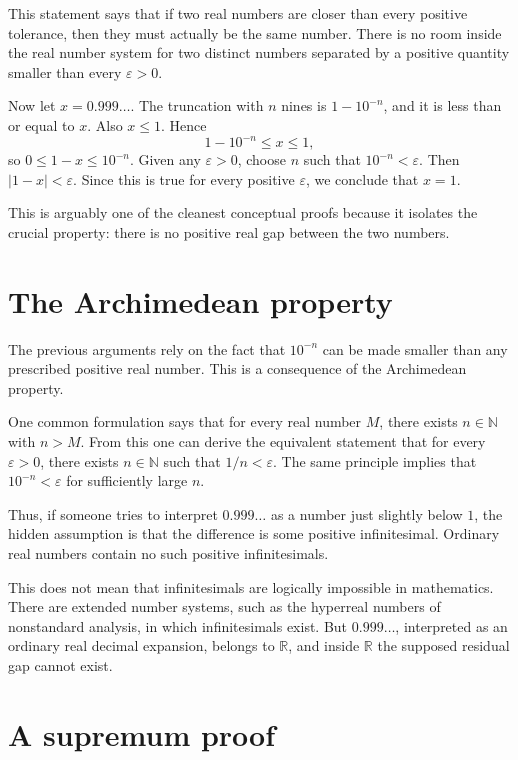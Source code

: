 \documentclass{essay}
\begin{document}
This statement says that if two real numbers are closer than every positive tolerance, then they must actually be the same number. There is no room inside the real number system for two distinct numbers separated by a positive quantity smaller than every \(\varepsilon>0\).

Now let \(x=0.999\ldots\). The truncation with \(n\) nines is \(1-10^{-n}\), and it is less than or equal to \(x\). Also \(x\le1\). Hence
\[ 1-10^{-n}\le x\le1, \]
so \(0\le1-x\le10^{-n}\). Given any \(\varepsilon>0\), choose \(n\) such that \(10^{-n}<\varepsilon\). Then \(|1-x|<\varepsilon\). Since this is true for every positive \(\varepsilon\), we conclude that \(x=1\).

This is arguably one of the cleanest conceptual proofs because it isolates the crucial property: there is no positive real gap between the two numbers.

\section{The Archimedean property}

The previous arguments rely on the fact that \(10^{-n}\) can be made smaller than any prescribed positive real number. This is a consequence of the Archimedean property.

One common formulation says that for every real number \(M\), there exists \(n\in\mathbb{N}\) with \(n>M\). From this one can derive the equivalent statement that for every \(\varepsilon>0\), there exists \(n\in\mathbb{N}\) such that \(1/n<\varepsilon\). The same principle implies that \(10^{-n}<\varepsilon\) for sufficiently large \(n\).

Thus, if someone tries to interpret \(0.999\ldots\) as a number just slightly below \(1\), the hidden assumption is that the difference is some positive infinitesimal. Ordinary real numbers contain no such positive infinitesimals.

This does not mean that infinitesimals are logically impossible in mathematics. There are extended number systems, such as the hyperreal numbers of nonstandard analysis, in which infinitesimals exist. But \(0.999\ldots\), interpreted as an ordinary real decimal expansion, belongs to \(\mathbb{R}\), and inside \(\mathbb{R}\) the supposed residual gap cannot exist.

\section{A supremum proof}
\end{document}
